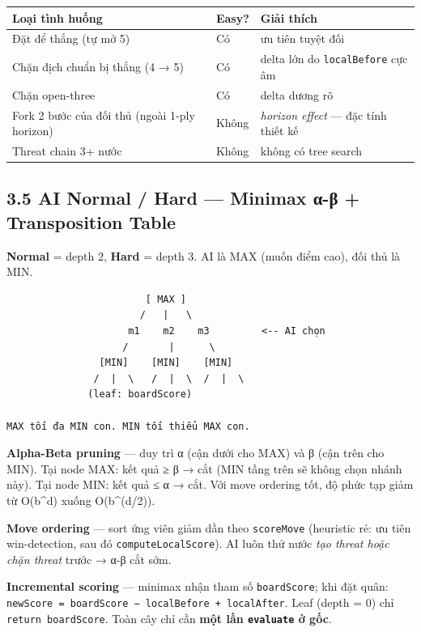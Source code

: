 \documentclass[11pt,a4paper]{article}
\begin{document}
\begin{center}
\begin{tabularx}{\textwidth}{XlX}
Loại tình huống & Easy? & Giải thích\\
\hline
Đặt để thắng (tự mở 5) & Có & ưu tiên tuyệt đối\\
Chặn địch chuẩn bị thắng (4 → 5) & Có & delta lớn do \texttt{localBefore} cực âm\\
Chặn open-three & Có & delta dương rõ\\
Fork 2 bước của đối thủ (ngoài 1-ply horizon) & Không & \emph{horizon effect} — đặc tính thiết kế\\
Threat chain 3+ nước & Không & không có tree search\\
\end{tabularx}
\end{center}
\subsection{3.5 AI Normal / Hard — Minimax α-β + Transposition Table}
\label{sec:org6852cd0}

\textbf{Normal} = depth 2, \textbf{Hard} = depth 3. AI là MAX (muốn điểm cao), đối thủ là MIN.

\begin{verbatim}
                        [ MAX ]
                       /   |   \
                     m1    m2    m3         <-- AI chọn
                    /       |      \
                [MIN]    [MIN]    [MIN]
               /  |  \   /  |  \  /  |  \
              (leaf: boardScore)

MAX tối đa MIN con. MIN tối thiểu MAX con.
\end{verbatim}

\textbf{Alpha-Beta pruning} — duy trì α (cận dưới cho MAX) và β (cận trên cho MIN). Tại node MAX: kết quả ≥ β → cắt (MIN tầng trên sẽ không chọn nhánh này). Tại node MIN: kết quả ≤ α → cắt. Với move ordering tốt, độ phức tạp giảm từ O(b\^{}d) xuống O(b\^{}(d/2)).

\textbf{Move ordering} — sort ứng viên giảm dần theo \texttt{scoreMove} (heuristic rẻ: ưu tiên win-detection, sau đó \texttt{computeLocalScore}). AI luôn thử nước \emph{tạo threat hoặc chặn threat} trước → α-β cắt sớm.

\textbf{Incremental scoring} — minimax nhận tham số \texttt{boardScore}; khi đặt quân: \texttt{newScore = boardScore − localBefore + localAfter}. Leaf (depth = 0) chỉ \texttt{return boardScore}. Toàn cây chỉ cần \textbf{một lần \texttt{evaluate} ở gốc}.
\end{document}

